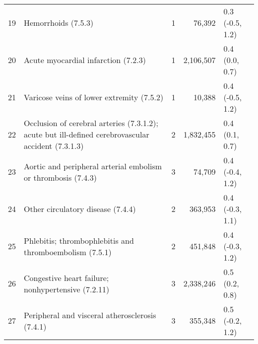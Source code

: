 \begin{tabular}{lp{6.5cm}rrp{2.2cm}}
  19 & Hemorrhoids (7.5.3) &  1 & 76,392 & 0.3 (-0.5, 1.2) \\ 
  20 & Acute myocardial infarction (7.2.3) &  1 & 2,106,507 & 0.4 (0.0, 0.7) \\ 
  21 & Varicose veins of lower extremity (7.5.2) &  1 & 10,388 & 0.4 (-0.5, 1.2) \\ 
  22 & Occlusion of cerebral arteries (7.3.1.2); acute but ill-defined cerebrovascular accident (7.3.1.3) &  2 & 1,832,455 & 0.4 (0.1, 0.7) \\ 
  23 & Aortic and peripheral arterial embolism or thrombosis (7.4.3) &  3 & 74,709 & 0.4 (-0.4, 1.2) \\ 
  24 & Other circulatory disease (7.4.4) &  2 & 363,953 & 0.4 (-0.3, 1.1) \\ 
  25 & Phlebitis; thrombophlebitis and thromboembolism (7.5.1) &  2 & 451,848 & 0.4 (-0.3, 1.2) \\ 
  26 & Congestive heart failure; nonhypertensive (7.2.11) &  3 & 2,338,246 & 0.5 (0.2, 0.8) \\ 
  27 & Peripheral and visceral atherosclerosis (7.4.1) &  3 & 355,348 & 0.5 (-0.2, 1.2) \\ 
   \hline
\end{tabular}

